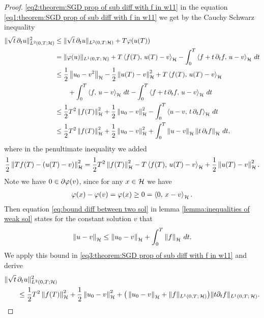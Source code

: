 \begin{proof}
	\eqref{eq2:theorem:SGD prop of sub diff with f in w11} 
	in the equation
	\eqref{eq1:theorem:SGD prop of sub diff with f in w11}
	we get by the Cauchy Schwarz inequality
	\begin{align}\label{eq3:theorem:SGD prop of sub diff with f in w11}
		\begin{split}
			\normltwo{\sqrt{t}\,\prt_t u}^2
			&\leq \normltwo{\sqrt{t}\,\prt_t u} + T\vp(u(T))\\
			&=\normlone{\vp(u)}
			+T\inner{f(T)}{u(T)-v}-\int_0^T \inner{f+t\, \prt_t f}{u-v}\,dt\\
			&\leq \frac{1}{2}\norm{u_0-v^2}-\frac{1}{2}\norm{u(T)-v}^2
			+T\inner{f(T)}{u(T)-v}\\
			&\qquad+\int_0^T \inner{f}{u-v}\,dt
			-\int_0^T \inner{f+t\, \prt_t f}{u-v}\,dt\\
			&\leq\frac{1}{2} T^2\norm{f(T)}^2
			+\frac{1}{2}\norm{u_0-v}^2
			-\int_0^T\inner{u-v}{t\,\prt_t f}\,dt\\
			&\leq\frac{1}{2} T^2\norm{f(T)}^2
			+\frac{1}{2}\norm{u_0-v}^2
			+\int_0^T\norm{u-v}\norm{t\,\prt_t f}\,dt,
		\end{split}
	\end{align}
	where in the penultimate inequality we added
	\begin{align*}
		\frac{1}{2}\norm{T f(T)-(u(T)-v)}^2
		=\frac{1}{2}T^2\norm{f(T)}^2
		-T\inner{f(T)}{u(T)-v}
		+\frac{1}{2}\norm{u(T)-v}^2.
	\end{align*}
	Note we have $ 0\in\prt\vp(v) $, since for any $ x\in\rH $ we have
	\begin{align*}
		\vp(x)-\vp(v)=\vp(x)\geq 0=\inner{0}{x-v}.
	\end{align*}
	Then equation \eqref{eq:bound diff between two sol} 
	in lemma \ref{lemma:inequalities of weak sol} states
	for the constant solution $ v $ that
	\begin{align*}
		\norm{u-v}\leq \norm{u_0-v}+\int_0^T\norm{f}\,dt.
	\end{align*}
	We apply this bound in 
	\eqref{eq3:theorem:SGD prop of sub diff with f in w11}
	and derive
	\begin{align}\label{eq4:theorem:SGD prop of sub diff with f in w11}
		\begin{split}
			\normltwo{\sqrt{t}\,&\prt_t u}^2\\
			&\leq\frac{1}{2} T^2\norm{f(T)}^2+\frac{1}{2}\norm{u_0-v}^2
			+\big(\norm{u_0-v}+\normlone{f}\big)\normlone{t\prt_t f}.
		\end{split}
	\end{align}

\end{proof}
